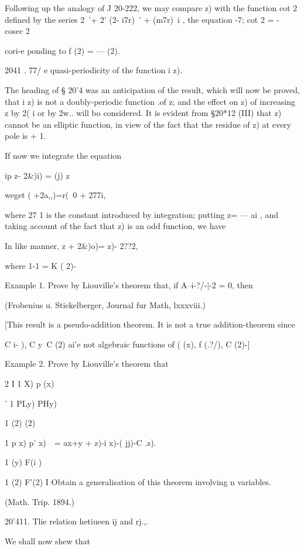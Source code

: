 {Following up the analogy of J  20-222, we may compare   z) with the function cot 2 
defined by the series 2~'+ 2'  (2- i7r)~' + (m7r)~i , the equation -7; cot 2 = - cosec  2 

cori-e ponding to   f (2) = —   (2). 

2041 . 77/ e quasi-periodicity of the function i  z). 

The heading of § 20'4 was an anticipation of the result, which will now be 
proved, that i  z) is not a doubly-periodic function .of z; and the effect on 
  z) of increasing z by 2( i or by 2w.. will bo considered. It is evident from 
§20*12 (III) that   z) cannot be an elliptic function, in view of the fact that 
the residue of   z) at every pole is + 1. 

If now we integrate the equation 

ip z-  2\&)i) = (j)  z\ 

weget  ( +2a,,)=r(~0 + 277i, 

where 27 1 is the constant introduced by integration; putting z= — ai , and 
taking account of the fact that    z) is an odd function, we have 

In like manner,   z + 2\&)o)=   z)-  2??2, 

where 1-1 = K ( 2)- 

Example 1. Prove by Liouville's theorem that, if A--i-?/-|-2 = 0, then 

(Frobenius u. Stiekelberger, Journal fur Math, lxxxviii.) 

[This result is a pseudo-addition theorem. It is not a true addition-theorem since 

C i- ), C  y\ C (2) ai'e not algebraic functions of ( (x), f (.?/), C (2)-] 

Example 2. Prove by Liouville's theorem that 



2 I 1    X) p  (x) 

' 1 PLy) PHy) 

1  (2)  (2) 



1 p x) p' x)\ \  = ax+y + z)-i x)-( jj)-C .z). 

1  (y) F(i ) 



1  (2) F'(2) I 
Obtain a generalisation of this theorem involving n variables. 

(Math. Trip. 1894.) 

20'411. Tlie relation hetiueen ij  and rj.,. 

We shall now shew that 

}
